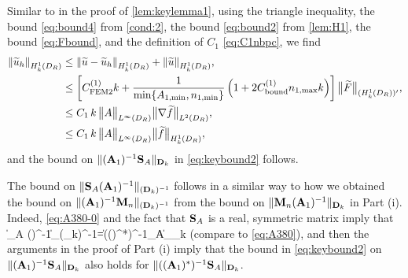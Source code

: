 Similar to in the proof of \cref{lem:keylemma1},
using the triangle inequality, the bound \cref{eq:bound4} from \cref{cond:2}, the bound \cref{eq:bound2} from \cref{lem:H1}, the bound \cref{eq:Fbound}, and the definition of $C_1$ \cref{eq:C1nbpc},
we find
\begin{align}\nonumber 
\N{\tu_h}_{\HokDR} &\leq
\N{\tu-\tu_h}_{\HokDR} + \N{\tu}_{\HokDR},\nonumber \\ \nonumber
& \leq \left[ C^{(1)}_{\rm FEM2} k + 
\frac{1}{\min\{\Aomin,\nomin\}}\left( 1 + 2 C^{(1)}_{\rm bound}\nomax k  \right) 
\right]\big\|\widetilde{F}\big\|_{(\HokDR)'},\\
&\leq C_1 \, k\, 
\big\|A\big\|_{L^\infty(\DR)} \big\|\nabla\widetilde{f}\big\|_{\LtDR},\label{eq:mainevent2}\\
&\leq C_1 \, k\, 
\big\|A\big\|_{L^\infty(\DR)} \big\|\widetilde{f}\big\|_{\HokDR},\nonumber
\end{align}
and the bound on $\|(\mathbf{A}_{1})^{-1}\mathbf{S}_A\|_{\mathbf{D}_k}$ in \cref{eq:keybound2} follows.

The bound on $\|\mathbf{S}_A(\mathbf{A}_{1})^{-1}\|_{(\mathbf{D}_k)^{-1}}$ follows in a similar way to how we obtained the 
bound on  $\|(\mathbf{A}_{1})^{-1}\mathbf{M}_n\|_{(\mathbf{D}_k)^{-1}}$ from the bound on $\|\mathbf{M}_n(\mathbf{A}_{1})^{-1}\|_{\mathbf{D}_k}$ in Part (i). Indeed, 
\cref{eq:A380-0} and the fact that $\mathbf{S}_A$ is a real, symmetric matrix imply that 
\beq\label{eq:A380-2} 
 \big\|\Smat_A (\Amato)^{-1}\big\|_{(\Dmat_k)^{-1}}=\big\|\big((\Amato)^*\big)^{-1}\Smat_A\big\|_{\Dmat_k}
 \eeq 
(compare to \cref{eq:A380}),
and then the arguments in the proof of Part (i) imply that 
the bound in \cref{eq:keybound2} on $\|(\mathbf{A}_{1})^{-1}\mathbf{S}_A\|_{\mathbf{D}_k}$ also holds for $\|((\mathbf{A}_{1})^*)^{-1}\mathbf{S}_A\|_{\mathbf{D}_k}$.

